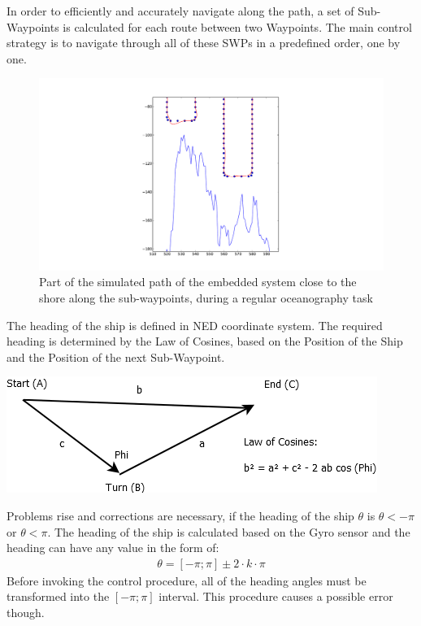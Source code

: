 In order to efficiently and accurately navigate along the path, a set of Sub-Waypoints is calculated for each route between two Waypoints. The main control strategy is to navigate through all of these SWPs in a predefined order, one by one.
\begin{figure}
	\begin{center}
		\includegraphics[width=\textwidth]{img/ControlStrategyFigures/Navi}    %
		\caption{Part of the simulated path of the embedded system close to the shore along the sub-waypoints, during a regular oceanography task}  %
		\label{fig:3points}               
	\end{center}                                 %
\end{figure}
The heading of the ship is defined in NED coordinate system. The required heading is determined by the Law of Cosines, based on the Position of the Ship and the Position of the next Sub-Waypoint.
\begin{center}
\includegraphics[scale = 0.4]{img/ControlStrategyFigures/Law_of_Cosines.png}
\end{center}
Problems rise and corrections are necessary, if the heading of the ship $\theta$ is $\theta < -\pi$ or $\theta < \pi$. The heading of the ship is calculated based on the Gyro sensor and the heading can have any value in the form of: 
\begin{align}
\theta = [-{\pi} ; \pi ] \pm 2 \cdot k \cdot \pi
\end{align}
Before invoking the control procedure, all of the heading angles must be transformed into the $[-\pi ; \pi]$ interval.
This procedure causes a possible error though.

